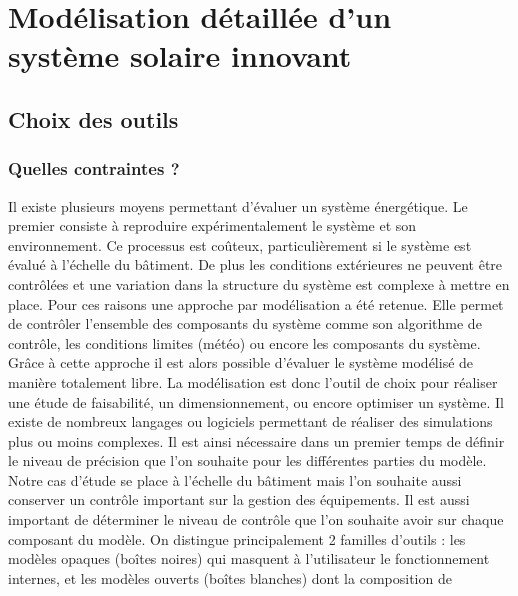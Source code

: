 \section{Modélisation détaillée d’un système solaire innovant} %
\label{sec:modelisation_detaillee_d_un_systeme_solaire_innovant}
\subsection{Choix des outils} %
\label{sub:choix_des_outils}
\subsubsection{Quelles contraintes ?} %
\label{ssub:quelles_contraintes}
Il existe plusieurs moyens permettant d’évaluer un système énergétique. Le premier
consiste à reproduire expérimentalement le système et son environnement. Ce processus est
coûteux, particulièrement si le système est évalué à l’échelle du bâtiment. De plus les
conditions extérieures ne peuvent être contrôlées et une variation dans la structure du
système est complexe à mettre en place. Pour ces raisons une approche par modélisation a
été retenue. Elle permet de contrôler l’ensemble des composants du système comme son
algorithme de contrôle, les conditions limites (météo) ou encore les composants du
système. Grâce à cette approche il est alors possible d’évaluer le système modélisé de
manière totalement libre. La modélisation est donc l’outil de choix pour réaliser une
étude de faisabilité, un dimensionnement, ou encore optimiser un système. Il existe de
nombreux langages ou logiciels permettant de réaliser des simulations plus ou moins
complexes. Il est ainsi nécessaire dans un premier temps de définir le niveau de précision
que l’on souhaite pour les différentes parties du modèle. Notre cas d’étude se place à
l’échelle du bâtiment mais l’on souhaite aussi conserver un contrôle important sur la
gestion des équipements. Il est aussi important de déterminer le niveau de contrôle que
l’on souhaite avoir sur chaque composant du modèle. On distingue principalement 2 familles
d’outils : les modèles opaques (boîtes noires) qui masquent à l’utilisateur le
fonctionnement internes, et les modèles ouverts (boîtes blanches) dont la composition de
